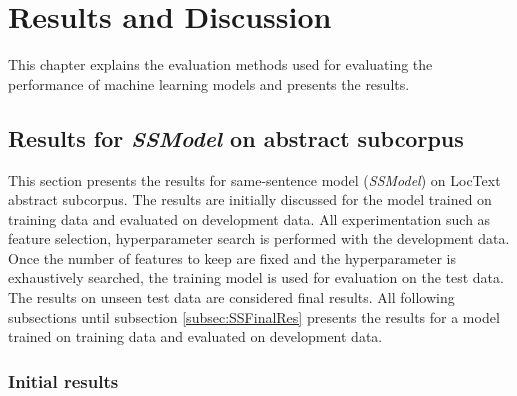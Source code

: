 \chapter{Results and Discussion}\label{chapter:results}

This chapter explains the evaluation methods used for evaluating the performance of machine learning models and presents the results.

\section{Results for \textit{SSModel} on abstract subcorpus}

This section presents the results for same-sentence model (\textit{SSModel}) on LocText abstract subcorpus. The results are initially discussed for the model trained on training data and evaluated on development data. All experimentation such as feature selection, hyperparameter search is performed with the development data. Once the number of features to keep are fixed and the hyperparameter is exhaustively searched, the training model is used for evaluation on the test data. The results on unseen test data are considered final results. All following subsections until subsection \ref{subsec:SSFinalRes} presents the results for a model trained on training data and evaluated on development data.

 
\subsection{Initial results}

